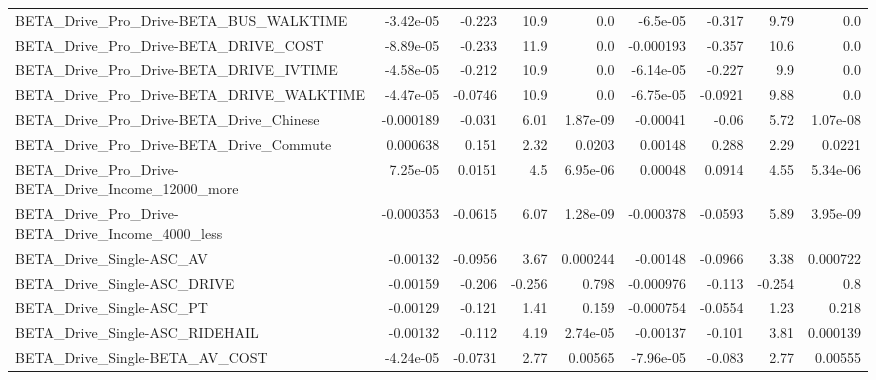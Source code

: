 \begin{tabular}{lrrrrrrrr}
BETA\_Drive\_Pro\_Drive-BETA\_BUS\_WALKTIME             &   -3.42e-05 &       -0.223 &      10.9 &      0.0 &   -6.5e-05 &      -0.317 &         9.79 &           0.0 \\
BETA\_Drive\_Pro\_Drive-BETA\_DRIVE\_COST               &   -8.89e-05 &       -0.233 &      11.9 &      0.0 &  -0.000193 &      -0.357 &         10.6 &           0.0 \\
BETA\_Drive\_Pro\_Drive-BETA\_DRIVE\_IVTIME             &   -4.58e-05 &       -0.212 &      10.9 &      0.0 &  -6.14e-05 &      -0.227 &          9.9 &           0.0 \\
BETA\_Drive\_Pro\_Drive-BETA\_DRIVE\_WALKTIME           &   -4.47e-05 &      -0.0746 &      10.9 &      0.0 &  -6.75e-05 &     -0.0921 &         9.88 &           0.0 \\
BETA\_Drive\_Pro\_Drive-BETA\_Drive\_Chinese            &   -0.000189 &       -0.031 &      6.01 & 1.87e-09 &   -0.00041 &       -0.06 &         5.72 &      1.07e-08 \\
BETA\_Drive\_Pro\_Drive-BETA\_Drive\_Commute            &    0.000638 &        0.151 &      2.32 &   0.0203 &    0.00148 &       0.288 &         2.29 &        0.0221 \\
BETA\_Drive\_Pro\_Drive-BETA\_Drive\_Income\_12000\_more  &    7.25e-05 &       0.0151 &       4.5 & 6.95e-06 &    0.00048 &      0.0914 &         4.55 &      5.34e-06 \\
BETA\_Drive\_Pro\_Drive-BETA\_Drive\_Income\_4000\_less   &   -0.000353 &      -0.0615 &      6.07 & 1.28e-09 &  -0.000378 &     -0.0593 &         5.89 &      3.95e-09 \\
BETA\_Drive\_Single-ASC\_AV                           &    -0.00132 &      -0.0956 &      3.67 & 0.000244 &   -0.00148 &     -0.0966 &         3.38 &      0.000722 \\
BETA\_Drive\_Single-ASC\_DRIVE                        &    -0.00159 &       -0.206 &    -0.256 &    0.798 &  -0.000976 &      -0.113 &       -0.254 &           0.8 \\
BETA\_Drive\_Single-ASC\_PT                           &    -0.00129 &       -0.121 &      1.41 &    0.159 &  -0.000754 &     -0.0554 &         1.23 &         0.218 \\
BETA\_Drive\_Single-ASC\_RIDEHAIL                     &    -0.00132 &       -0.112 &      4.19 & 2.74e-05 &   -0.00137 &      -0.101 &         3.81 &      0.000139 \\
BETA\_Drive\_Single-BETA\_AV\_COST                     &   -4.24e-05 &      -0.0731 &      2.77 &  0.00565 &  -7.96e-05 &      -0.083 &         2.77 &       0.00555 \\

\end{tabular}
